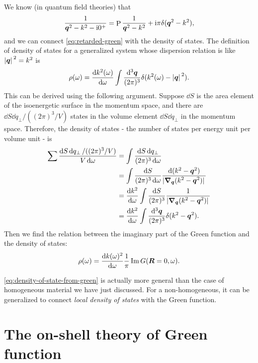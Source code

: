 \documentclass[hyperref, a4paper]{article}
\DeclareMathOperator{\primevalue}{P}
\newcommand*{\ii}{\mathrm{i}}
\begin{document}
We know (in quantum field theories) that 
\[
    \frac{1}{\vb*{q}^2 - k^2 - \ii 0^+} = \primevalue \frac{1}{\vb*{q}^2 - k^2} + \ii \pi \delta(\vb*{q}^2 - k^2),
\]
and we can connect \eqref{eq:retarded-green} with the density of states. The definition of density of states 
for a generalized system whose dispersion relation is like $\abs*{\vb*{q}}^2 = k^2$ is 
\begin{equation}
    \rho(\omega) = \dv{k^2(\omega)}{\omega} \int \frac{\dd[3]{\vb*{q}}}{(2\pi)^3} \delta(k^2(\omega) - \abs*{\vb*{q}}^2).
    \label{eq:density-of-states-light}
\end{equation}
This can be derived using the following argument. Suppose $\dd{S}$ is the area element of the isoenergetic surface
in the momentum space, and there are $\dd{S} \dd{q_\bot} / ((2\pi)^3 / V)$ states in the volume element 
$\dd{S} \dd{q_\bot}$ in the momentum space. Therefore, the density of states - the number of states per energy unit
per volume unit - is 
\[
    \begin{aligned}
        \sum \frac{\dd{S} \dd{q_\bot} / ((2\pi)^3 / V)}{V \dd{\omega}} &= \int \frac{\dd{S} \dd{q_\bot}}{(2\pi)^3 \dd{\omega}} \\
        &=  \int \frac{\dd{S} }{(2\pi)^3 \dd{\omega}} \frac{\dd{(k^2 - \vb*{q}^2)}}{\abs*{\grad_{\vb*{q}} (k^2 - \vb*{q}^2)}} \\
        &= \dv{k^2}{\omega} \int \frac{\dd{S}}{(2\pi)^3} \frac{1}{\abs*{\grad_{\vb*{q}} (k^2 - \vb*{q}^2)}} \\
        &= \dv{k^2}{\omega} \int \frac{\dd[3]{\vb*{q}}}{(2\pi)^3} \delta(k^2 - \vb*{q}^2).
    \end{aligned}
\]
Then we find the relation between the imaginary part of the Green function and the density of states:
\begin{equation}
    \rho(\omega) = \dv{k(\omega)^2}{\omega} \frac{1}{\pi} \Im G(\vb*{R} = 0, \omega).
    \label{eq:density-of-state-from-green}
\end{equation}

\eqref{eq:density-of-state-from-green} is actually more general than the case of homogeneous material 
we have just discussed. For a non-homogeneous, it can be generalized to connect \emph{local density of states} 
with the Green function.

\section{The on-shell theory of Green function}
\end{document}
